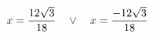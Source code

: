 \documentclass[preview]{standalone}
\begin{document}
\begin{align*}
\special{dvisvgm:raw <g id='unique000'>}x=\frac{12 \sqrt{3}}{18} \quad \lor \quad x=\frac{- 12 \sqrt{3}}{18}\special{dvisvgm:raw </g>}
\end{align*}
\end{document}
